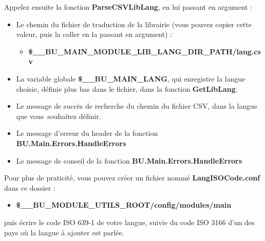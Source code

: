 \documentclass[a4paper,10pt]{article}
\begin{document}
\begin{justify}
    Appelez ensuite la fonction \textbf{\color{mauve}ParseCSVLibLang}, en lui passant en argument :

    \begin{itemize}
        \item Le chemin du fichier de traduction de la librairie (vous pouvez copier cette valeur, puis la coller en la passant en argument) :
        \begin{itemize}
            \item \textbf{\color{vars}\$\_\_BU\_MAIN\_MODULE\_LIB\_LANG\_DIR\_PATH\color{path}/lang.csv}\\\mbox{}
        \end{itemize}

        \item La variable globale \textbf{\color{vars}\$\_\_BU\_MAIN\_LANG}, qui enregistre la langue choisie, définie plus bas dans le fichier, dans la fonction \textbf{\color{mauve}GetLibLang}.\\\mbox{}

        \item Le message de succès de recherche du chemin du fichier CSV, dans la langue que vous\ souhaitez définir.\\\mbox{}

        \item Le message d'erreur du header de la fonction \textbf{\color{mauve}BU.Main.Errors.HandleErrors}\\\mbox{}

        \item Le message de conseil de la fonction \textbf{\color{mauve}BU.Main.Errors.HandleErrors}
    \end{itemize}
\end{justify}

\begin{justify}
    Pour plus de praticité, vous pouvez créer un fichier nommé \textbf{\color{path}LangISOCode.conf} dans ce dossier :

    \begin{itemize}
        \item \textbf{\color{vars}\$\_\_BU\_MODULE\_UTILS\_ROOT\color{path}/config/modules/main}
    \end{itemize}
\end{justify}

\begin{justify}
    puis écrire le code ISO 639-1 de votre langue, suivie du code ISO 3166 d'un des pays où la langue à ajouter est parlée.
\end{justify}
\end{document}
